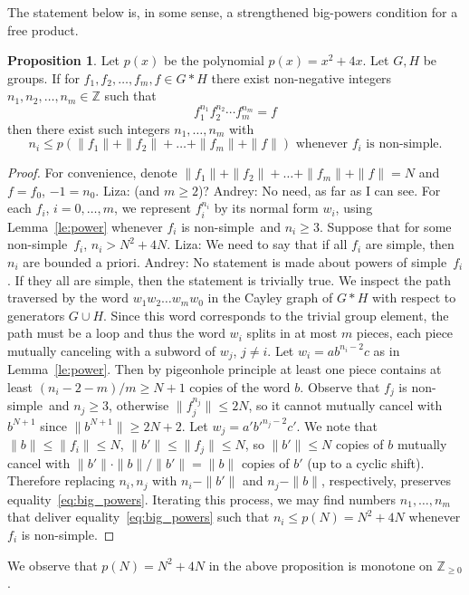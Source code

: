 \documentclass[10pt]{amsart}
\newcommand{\an}{\noindent\color{red} Andrey: }{}
\newcommand{\li}{\noindent\color{blue} Liza: }{}
\theoremstyle{definition}
\newtheorem{proposition}[theorem]{Proposition}
\def\dumb{simple} %
\def\nondumb{non-simple} %
\begin{document}
The statement below is, in some sense, a strengthened big-powers condition for a free product.
\begin{proposition}\label{pr:big_power}
Let $p(x)$ be the polynomial $p(x)=x^2+4x$. Let $G,H$ be groups. If for $f_1,f_2,\ldots, f_m, f\in G*H$ there exist non-negative integers $n_1,n_2,\ldots,n_m\in\mathbb Z$ such that
\begin{equation}\label{eq:big_powers}
f_1^{n_1}f_2^{n_2}\cdots f_m^{n_m}=f
\end{equation}
then there exist such integers $n_1,\ldots,n_m$ with
$$n_i\le p(\|f_1\|+\|f_2\|+\ldots+\|f_m\|+\|f\|)\mbox{ whenever } f_i\mbox{ is \nondumb}.
$$
\end{proposition}
\begin{proof} For convenience, denote $\|f_1\|+\|f_2\|+\ldots+\|f_m\|+\|f\|=N$ and $f=f_0$, $-1=n_0$. {\li (and $m \ge 2$)?} {\an No need, as far as I can see.}
For each $f_i$, $i=0,\ldots,m$, we represent $f_i^{n_i}$ by its normal form $w_i$, using Lemma~\ref{le:power} whenever $f_i$ is \nondumb\ and $n_i\ge 3$. Suppose that for some \nondumb\ $f_i$, $n_i > N^2+4N$. {\li We need to say that if all $f_i$ are \dumb, then $n_i$ are bounded a priori.} {\an No statement is made about powers of \dumb\ $f_i$. If they all are \dumb, then the statement is trivially true.}   We inspect the path traversed by the word $w_1w_2\ldots w_mw_0$  in the Cayley graph of $G*H$ with respect to generators $G\cup H$. Since this word corresponds to the trivial group element, the path must be a loop and thus the word $w_i$ splits in at most $m$ pieces, each piece mutually canceling with a subword of $w_j$, $j\neq i$. Let $w_i=ab^{n_i-2}c$ as in Lemma~\ref{le:power}. Then by pigeonhole principle at least one piece contains at least $(n_i-2-m)/m\ge N+1$ copies of the word $b$. Observe that $f_j$ is \nondumb\ and $n_j\ge 3$, otherwise $\|f_j^{n_j}\|\le 2N$, so it cannot mutually cancel with $b^{N+1}$ since $\|b^{N+1}\|\ge 2N+2$. Let $w_j=a'{b'}^{n_j-2}c'$. We note that $\|b\|\le \|f_i\|\le N$, $\|b'\|\le \|f_j\|\le N$, so $\|b'\|\le N$ copies of $b$ mutually cancel with $\|b'\|\cdot\|b\|/\|b'\|=\|b\|$ copies of $b'$ (up to a cyclic shift). Therefore replacing $n_i,n_j$ with $n_i-\|b'\|$ and $n_j-\|b\|$, respectively, preserves equality~\eqref{eq:big_powers}. Iterating this process, we may find numbers $n_1,\ldots, n_m$ that deliver equality~\eqref{eq:big_powers} such that $n_i\le p(N)=N^2+4N$ whenever $f_i$ is \nondumb.
\end{proof}
We observe that $p(N)=N^2+4N$ in the above proposition is monotone on $\mathbb{Z}_{\ge 0}$.
\end{document}
